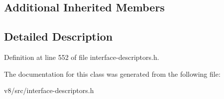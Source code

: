 \subsection*{Additional Inherited Members}


\subsection{Detailed Description}


Definition at line 552 of file interface-\/descriptors.\+h.



The documentation for this class was generated from the following file\+:\begin{DoxyCompactItemize}
\item 
v8/src/interface-\/descriptors.\+h\end{DoxyCompactItemize}
